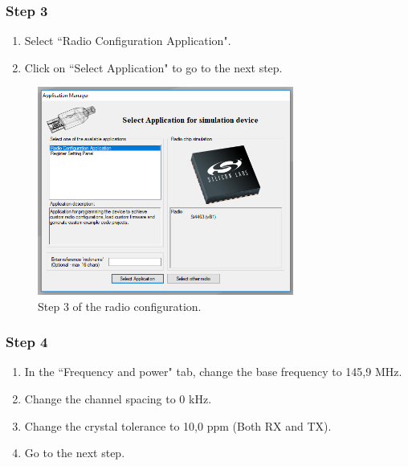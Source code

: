 \subsubsection{Step 3}

\begin{enumerate}
    \item Select ``Radio Configuration Application".
    \item Click on ``Select Application" to go to the next step.
\end{enumerate}

\begin{figure}[!h]
	\begin{center}
		\includegraphics[width=0.75\textwidth]{figures/wds-tutorial/wds-tutorial-3.png}
		\caption{Step 3 of the radio configuration.}
		\label{fig:wds-tutorial-step-3}
	\end{center}
\end{figure}

\subsubsection{Step 4}

\begin{enumerate}
    \item In the ``Frequency and power" tab, change the base frequency to 145,9 MHz.
    \item Change the channel spacing to 0 kHz.
    \item Change the crystal tolerance to 10,0 ppm (Both RX and TX).
    \item Go to the next step.
\end{enumerate}

